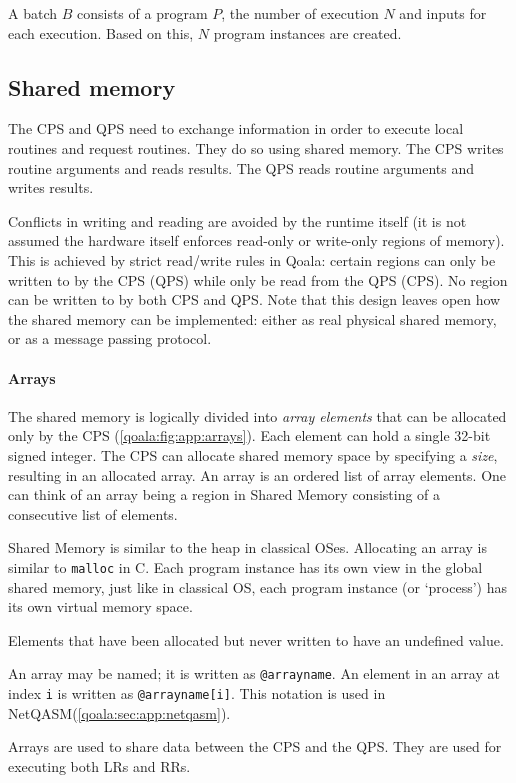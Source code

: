 A batch $B$ consists of a program $P$, the number of execution $N$ and inputs for each execution. Based on this, $N$ program instances are created.


\subsection{Shared memory}
\label{qoala:sec:app:shared_memory}
The CPS and QPS need to exchange information in order to execute local routines and request routines. They do so using shared memory.
The CPS writes routine arguments and reads results.
The QPS reads routine arguments and writes results.

Conflicts in writing and reading are avoided by the runtime itself (it is not assumed the hardware itself enforces read-only or write-only regions of memory).
This is achieved by strict read/write rules in Qoala: certain regions can only be written to by the CPS (QPS) while only be read from the QPS (CPS).
No region can be written to by both CPS and QPS.
Note that this design leaves open how the shared memory can be implemented: either as real physical shared memory, or as a message passing protocol.


\paragraph{Arrays}
The shared memory is logically divided into \textit{array elements} that can be allocated only by the CPS (\cref{qoala:fig:app:arrays}).
Each element can hold a single 32-bit signed integer.
The CPS can allocate shared memory space by specifying a \textit{size}, resulting in an allocated array.
An array is an ordered list of array elements. 
One can think of an array being a region in Shared Memory consisting of a consecutive list of elements.

Shared Memory is similar to the heap in classical OSes. Allocating an array is similar to \texttt{malloc} in C. Each program instance has its own view in the global shared memory, just like in classical OS, each program instance (or `process') has its own virtual memory space.

Elements that have been allocated but never written to have an undefined value.

An array may be named; it is written as \texttt{@arrayname}. An element in an array at index \texttt{i} is written as \texttt{@arrayname[i]}. This notation is used in NetQASM(\cref{qoala:sec:app:netqasm}).

Arrays are used to share data between the CPS and the QPS.
They are used for executing both LRs and RRs.

